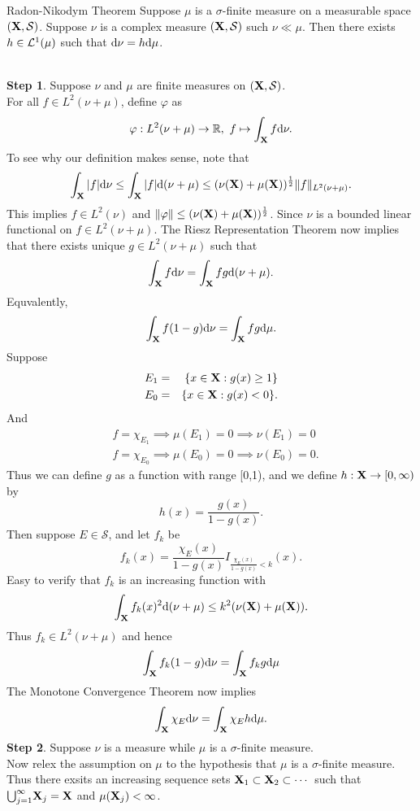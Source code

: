 \begin{stheorem}{Radon-Nikodym Theorem}{}
Suppose $\mu$ is a $\sigma$-finite measure on a measurable space $(\mathbf{X},\mathcal S)$. Suppose $\nu$ is a complex measure $(\mathbf{X},\mathcal S)$ such $\nu \ll \mu$. Then there exists $h \in \mathcal{L}^1(\mu)$ such that $\mathrm{d} \nu = h\mathrm{d} \mu$.
\end{stheorem}
\begin{Proof} \ \\
\textbf{Step 1}. Suppose $\nu$ and $\mu$ are finite measures on $(\mathbf{X},\mathcal S)$. \\
For all $f \in L^2(\nu+\mu)$, define $\varphi$ as 
$$
\varphi : L^2(\nu+\mu) \to \mathbb{R}, \ f \mapsto \int_{\mathbf{X}} f \mathrm{d} \nu.
$$ 
To see why our definition makes sense, note that 
$$
\int_{\mathbf{X}} |f| \mathrm{d} \nu \leq \int_{\mathbf{X}} |f| \mathrm{d} (\nu+\mu) \leq (\nu(\mathbf{X})+\mu(\mathbf{X}))^{\frac{1}{2}}\Vert f\Vert_{L^2(\nu+\mu)}.
$$
This implies $f\in L^2(\nu)$ and $\Vert \varphi \Vert \leq (\nu(\mathbf{X})+\mu(\mathbf{X}))^{\frac{1}{2}}$.
Since $\nu$ is a bounded linear functional on $f \in L^2(\nu+\mu)$. The Riesz Representation Theorem now implies that there exists unique $g \in L^2(\nu+\mu)$ such that 
$$
\int_{\mathbf{X}} f \mathrm{d} \nu = \int_{\mathbf{X}} fg \mathrm{d} (\nu+\mu).
$$
Equvalently,
$$
\int_{\mathbf{X}} f(1-g) \mathrm{d} \nu = \int_{\mathbf{X}} fg \mathrm{d} \mu.
$$
Suppose 
\begin{eqnarray*}
	E_1 &=& \{ x\in \mathbf{X}: g(x) \geq 1   \}\\
    E_0 &=& \{ x\in \mathbf{X}: g(x) < 0   \}.
\end{eqnarray*}
And 
\begin{eqnarray*}
	&f=\chi_{E_1} \implies \mu(E_1) = 0 \implies \nu(E_1)=0 \\
	&f= \chi_{E_0} \implies \mu(E_0) = 0 \implies \nu(E_0)=0.
\end{eqnarray*}
Thus we can define $g$ as a function with range [0,1), and we define $h:\mathbf{X} \to [0,\infty)$ by
$$
h(x) = \frac{g(x)}{1-g(x)}.
$$
Then suppose $E\in\mathcal S$, and let $f_k$ be
$$
f_k(x) = \frac{\chi_E(x)}{1-g(x)}I_{\frac{\chi_E(x)}{1-g(x)}<k}(x).
$$
Easy to verify that $f_k$ is an increasing function with
$$
\int_{\mathbf{X}} f_k(x)^2 \mathrm{d} (\nu+\mu) \leq k^2 (\nu(\mathbf{X})+\mu(\mathbf{X})).
$$
Thus $f_k \in L^2(\nu+\mu)$ and hence 
$$
\int_{\mathbf{X}} f_k(1-g) \mathrm{d} \nu = \int_{\mathbf{X}} f_kg\mathrm{d} \mu
$$
The Monotone Convergence Theorem now implies 
$$
\int_{\mathbf{X}} \chi_E \mathrm{d} \nu = \int_{\mathbf{X}} \chi_E h \mathrm{d} \mu.
$$
\textbf{Step 2}. Suppose $\nu$ is a measure while $\mu$ is a $\sigma$-finite measure. \\
Now relex the assumption on $\mu$ to the hypothesis that $\mu$ is a $\sigma$-finite measure.
Thus there exsits an increasing sequence sets $\mathbf{X}_1\subset\mathbf{X}_2 \subset \cdots$ such that ${\bigcup_{j=1}^{\infty}}\mathbf{X}_j=\mathbf{X}$ and $\mu(\mathbf{X}_j)<\infty$.

\end{Proof}
